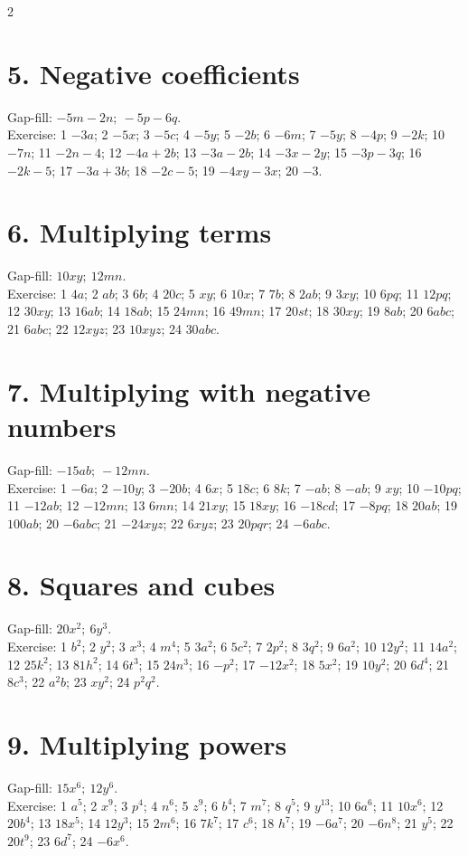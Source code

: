 \documentclass[12pt,a4paper]{article}
\begin{document}
\begin{multicols}{2}
\section*{5. Negative coefficients}
Gap-fill: \(-5m-2n;\ -5p-6q\).\\
Exercise: 1 \(-3a\); 2 \(-5x\); 3 \(-5c\); 4 \(-5y\); 5 \(-2b\); 6 \(-6m\); 7 \(-5y\); 8 \(-4p\); 9 \(-2k\); 10 \(-7n\); 11 \(-2n-4\); 12 \(-4a+2b\); 13 \(-3a-2b\); 14 \(-3x-2y\); 15 \(-3p-3q\); 16 \(-2k-5\); 17 \(-3a+3b\); 18 \(-2c-5\); 19 \(-4xy-3x\); 20 \(-3\).

\section*{6. Multiplying terms}
Gap-fill: \(10xy;\ 12mn\).\\
Exercise: 1 \(4a\); 2 \(ab\); 3 \(6b\); 4 \(20c\); 5 \(xy\); 6 \(10x\); 7 \(7b\); 8 \(2ab\); 9 \(3xy\); 10 \(6pq\); 11 \(12pq\); 12 \(30xy\); 13 \(16ab\); 14 \(18ab\); 15 \(24mn\); 16 \(49mn\); 17 \(20st\); 18 \(30xy\); 19 \(8ab\); 20 \(6abc\); 21 \(6abc\); 22 \(12xyz\); 23 \(10xyz\); 24 \(30abc\).

\section*{7. Multiplying with negative numbers}
Gap-fill: \(-15ab;\ -12mn\).\\
Exercise: 1 \(-6a\); 2 \(-10y\); 3 \(-20b\); 4 \(6x\); 5 \(18c\); 6 \(8k\); 7 \(-ab\); 8 \(-ab\); 9 \(xy\); 10 \(-10pq\); 11 \(-12ab\); 12 \(-12mn\); 13 \(6mn\); 14 \(21xy\); 15 \(18xy\); 16 \(-18cd\); 17 \(-8pq\); 18 \(20ab\); 19 \(100ab\); 20 \(-6abc\); 21 \(-24xyz\); 22 \(6xyz\); 23 \(20pqr\); 24 \(-6abc\).

\section*{8. Squares and cubes}
Gap-fill: \(20x^2;\ 6y^3\).\\
Exercise: 1 \(b^2\); 2 \(y^2\); 3 \(x^3\); 4 \(m^4\); 5 \(3a^2\); 6 \(5c^2\); 7 \(2p^2\); 8 \(3q^2\); 9 \(6a^2\); 10 \(12y^2\); 11 \(14a^2\); 12 \(25k^2\); 13 \(81h^2\); 14 \(6t^3\); 15 \(24n^3\); 16 \(-p^2\); 17 \(-12x^2\); 18 \(5x^2\); 19 \(10y^2\); 20 \(6d^4\); 21 \(8c^3\); 22 \(a^2b\); 23 \(xy^2\); 24 \(p^2q^2\).

\section*{9. Multiplying powers}
Gap-fill: \(15x^6;\ 12y^6\).\\
Exercise: 1 \(a^5\); 2 \(x^9\); 3 \(p^4\); 4 \(n^6\); 5 \(z^9\); 6 \(b^4\); 7 \(m^7\); 8 \(q^5\); 9 \(y^{13}\); 10 \(6a^6\); 11 \(10x^6\); 12 \(20b^4\); 13 \(18x^5\); 14 \(12y^3\); 15 \(2m^6\); 16 \(7k^7\); 17 \(c^6\); 18 \(h^7\); 19 \(-6a^7\); 20 \(-6n^8\); 21 \(y^5\); 22 \(20t^9\); 23 \(6d^7\); 24 \(-6x^6\).


\end{multicols}
\end{document}
